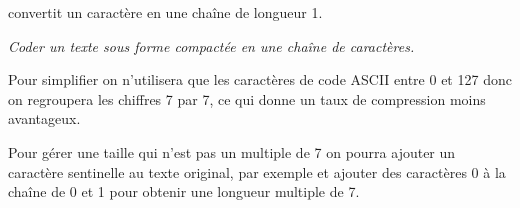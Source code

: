  convertit un caractère en une chaîne de longueur 1.
\begin{Exercise}[title = Codage compacté]\it 
Coder un texte sous forme compactée en une chaîne de caractères.

Pour simplifier on n'utilisera que les caractères de code ASCII entre 0 et 127 donc on regroupera les chiffres 7 par 7, ce qui donne un taux de compression moins avantageux.

Pour gérer une taille qui n'est pas un multiple de 7 on pourra ajouter un caractère sentinelle au texte original, par exemple  et ajouter des caractères 0 à la chaîne de 0 et 1 pour obtenir une longueur multiple de 7.
\end{Exercise}
\begin{Answer}
\begin{lstlisting}
\end{lstlisting}
\end{Answer}
%
%
%
%


